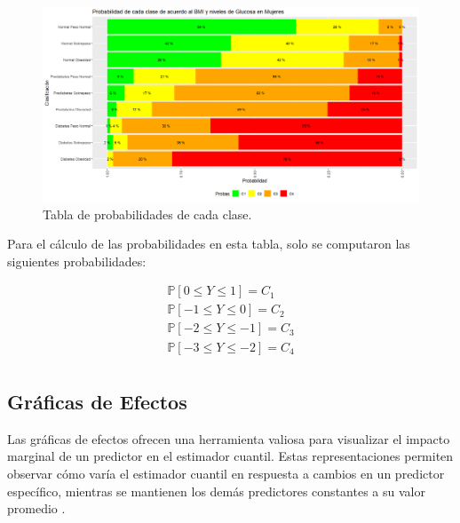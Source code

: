 \begin{figure}[H]
    \centering
    \includegraphics[height = 10 cm, width = 0.9 \textwidth]{4img/tablaM.png}
    \caption{Tabla de probabilidades de cada clase.}
    \label{fig:ejemploTabla}
\end{figure}

Para el cálculo de las probabilidades en esta tabla, solo se computaron las siguientes probabilidades:

\begin{equation}
     \begin{matrix}
\mathbb{P}[0 \leq Y \leq 1] = C_1 \\
\mathbb{P}[-1 \leq Y \leq 0] = C_2  \\
\mathbb{P}[-2 \leq Y \leq -1] = C_3 \\
\mathbb{P}[-3 \leq Y \leq -2] = C_4 \\
\end{matrix}
\end{equation}

\subsection{Gráficas de Efectos}

Las gráficas de efectos ofrecen una herramienta valiosa para visualizar el impacto marginal de un predictor en el estimador cuantil. Estas representaciones permiten observar cómo varía el estimador cuantil en respuesta a cambios en un predictor específico, mientras se mantienen los demás predictores constantes a su valor promedio \cite{Tepegjozova2022}.

